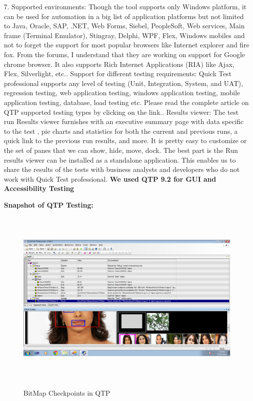 7. Supported environments: Though the tool supports only Windows platform, it can be used for automation in a big list of application platforms but not limited to Java, Oracle, SAP, .NET, Web Forms, Siebel, PeopleSoft, Web services, Main frame (Terminal Emulator), Stingray, Delphi, WPF, Flex, Windows mobiles and not to forget the support for most popular browsers like Internet explorer and fire fox. From the forums, I understand that they are working on support for Google chrome browser. It also supports Rich Internet Applications (RIA) like Ajax, Flex, Silverlight, etc.. Support for different testing requirements: Quick Test professional supports any level of testing (Unit, Integration, System, and UAT), regression testing, web application testing, windows application testing, mobile application testing, database, load testing etc. Please read the complete article on QTP supported testing types by clicking on the link.. Results viewer: The test run Results viewer furnishes with an executive summary page with data specific to the test , pie charts and statistics for both the current and previous runs, a quick link to the previous run results, and more. It is pretty easy to customize or the set of panes that we can show, hide, move, dock. The best part is the Run results viewer can be installed as a standalone application. This enables us to share the results of the tests with business analysts and developers who do not work with Quick Test professional.\newline
\textbf {We used QTP 9.2 for GUI and Accessibility Testing}

\newpage
\textbf{Snapshot of QTP Testing:}

\begin{figure}[ht!]
	\centering
\includegraphics[height=250pt,width=450pt]{qtp1.png}\\
\caption{BitMap Checkpoints in QTP}
\end{figure}

